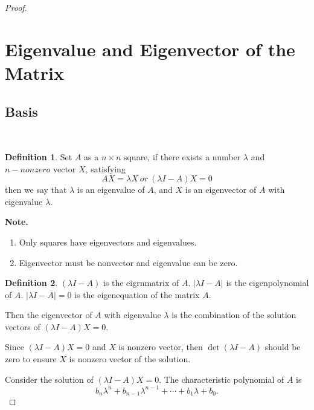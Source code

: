 \documentclass{article}
\theoremstyle{definition}
\newtheorem{defi}{Definition}[section]
\begin{document}
\begin{proof}









\section{Eigenvalue and Eigenvector of the Matrix}
\subsection{Basis}\
\begin{defi}
    Set $A$ as a $n\times n$ square, if there exists a 
    number $\lambda$ and $n-nonzero$ vector $X$, satisfying 
    $$AX=\lambda X\ or\ (\lambda I-A)X=0$$
    then we say that $\lambda$ is an eigenvalue of $A$, and
    $X$ is an eigenvector of $A$ with eigenvalue $\lambda$.
\end{defi}

\textbf{Note.}
\begin{enumerate}
    \item Only squares have eigenvectors and eigenvalues.
    \item Eigenvector must be nonvector and eigenvalue can be zero.
\end{enumerate}


\begin{defi}
    $(\lambda I-A)$ is the eigrnmatrix of $A$. $|\lambda I-A|$ is the eigenpolynomial of $A$.
    $|\lambda I-A|=0$ is the eigenequation of the matrix $A$.
\end{defi}

Then the eigenvector of $A$ with eigenvalue $\lambda$ is the combination of the solution vectors of $(\lambda I-A)X=0$.

Since $(\lambda I-A)X=0$ and $X$ is nonzero vector, then 
$\det (\lambda I-A)$ should be zero to ensure $X$ is nonzero vector of the solution.

Consider the solution of $(\lambda I-A)X=0$.
The characteristic polynomial of $A$ is 
$$b_{n}\lambda^{n}+b_{n-1}\lambda^{n-1}+\cdots+b_{1}\lambda+b_{0}.$$


\end{proof}
\end{document}
